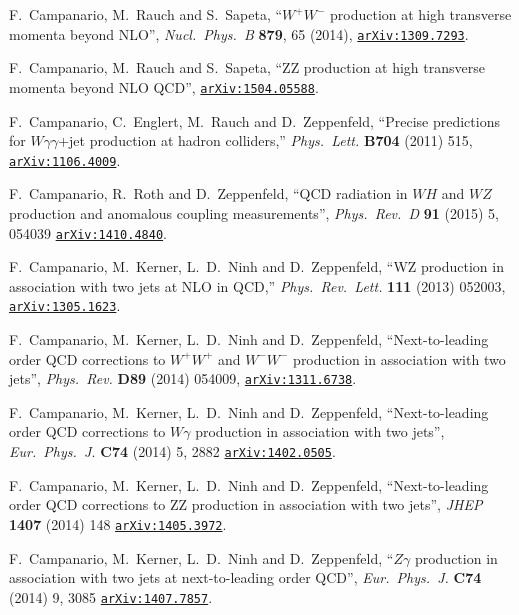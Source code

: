 \documentclass[english,12pt]{article}
\begin{document}
\begin{thebibliography}{10}
  F.~Campanario, M.~Rauch and S.~Sapeta,
  ``$W^+W^-$ production at high transverse momenta beyond NLO'',
  {\em Nucl.\ Phys.\ B} {\bf 879}, 65 (2014),
\href{https://www.arXiv.org/abs/1309.7293}{{\tt arXiv:1309.7293}}.

  F.~Campanario, M.~Rauch and S.~Sapeta,
  ``ZZ production at high transverse momenta beyond NLO QCD'',
\href{https://www.arXiv.org/abs/1504.05588}{{\tt arXiv:1504.05588}}.

  F.~Campanario, C.~Englert, M.~Rauch and D.~Zeppenfeld,
  ``Precise predictions for $W \gamma \gamma$+jet production at hadron colliders,''
  {\em Phys.\ Lett.} {\bf B704} (2011) 515,
  \href{https://www.arXiv.org/abs/1106.4009}{{\tt arXiv:1106.4009}}.

  F.~Campanario, R.~Roth and D.~Zeppenfeld,
  ``QCD radiation in $WH$ and $WZ$ production and anomalous coupling measurements'',
  {\em Phys.\ Rev.\ D} {\bf 91} (2015) 5,  054039
  \href{https://www.arXiv.org/abs/1410.4840}{{\tt arXiv:1410.4840}}.
  
  F.~Campanario, M.~Kerner, L.~D.~Ninh and D.~Zeppenfeld,
  ``WZ production in association with two jets at NLO in QCD,''
  {\em Phys.\ Rev.\ Lett.} {\bf 111} (2013) 052003,
  \href{https://arXiv.org/abs/1305.1623} {{\tt arXiv:1305.1623}}.

  F.~Campanario, M.~Kerner, L.~D.~Ninh and D.~Zeppenfeld,
  ``Next-to-leading order QCD corrections to $W^+W^+$ and $W^-W^-$ production in association with two jets'',
  {\em Phys.\ Rev.} {\bf D89} (2014) 054009,
  \href{https://arXiv.org/abs/1311.6738} {{\tt arXiv:1311.6738}}.

  F.~Campanario, M.~Kerner, L.~D.~Ninh and D.~Zeppenfeld,
  ``Next-to-leading order QCD corrections to $W \gamma$ production in association with two jets'',
  {\em Eur.\ Phys.\ J.} {\bf C74} (2014) 5, 2882 
  \href{https://arXiv.org/abs/1402.0505} {{\tt arXiv:1402.0505}}.

  F.~Campanario, M.~Kerner, L.~D.~Ninh and D.~Zeppenfeld,
  ``Next-to-leading order QCD corrections to ZZ production in association with two jets'',
  {\em JHEP} {\bf 1407} (2014) 148 
  \href{https://arXiv.org/abs/1405.3972} {{\tt arXiv:1405.3972}}.

  F.~Campanario, M.~Kerner, L.~D.~Ninh and D.~Zeppenfeld,
  ``$Z\gamma$ production in association with two jets at next-to-leading order QCD'',
  {\em Eur.\ Phys.\ J.} {\bf C74} (2014) 9, 3085 
  \href{https://arXiv.org/abs/1407.7857} {{\tt arXiv:1407.7857}}.


\end{thebibliography}
\end{document}
